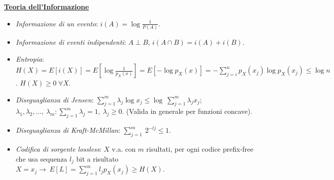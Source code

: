 \documentclass[8pt]{extarticle}
\begin{document}
\begin{multicols*}{3}
    \textbf{\underline{Teoria dell'Informazione}}
    \begin{itemize}
        \item \textit{Informazione di un evento}: $i(A)=\log{\frac{1}{P(A)}}$.
        \item \textit{Informazione di eventi indipendenti}: $A\perp B$, $i(A\cap B)=i(A)+i(B)$.
        \item \textit{Entropia}: $H(X)=E\left[i(X)\right]=E\left[\log\frac{1}{p_{X}(x)}\right]=E\left[-\log p_{X}(x)\right]=-\sum_{j=i}^{n}p_{X}(x_{j})\log p_{X}(x_{j})\leq \log n$. $H(X)\ge 0\; \forall X$.
        \item \textit{Diseguaglianza di Jensen}: $\sum_{j=1}^{m}{\lambda_j\log{x_j}}\le\log{\ \sum_{j=1}^{m}{\lambda_jx_j}}$; $\lambda_1,\lambda_2,\ldots,\ \lambda_m:\sum_{j=1}^{m}\lambda_j=1,\ \lambda_j\geq 0$. (Valida in generale per funzioni concave).
        \item \textit{Diseguaglianza di Kraft-McMillan}: $\sum_{j=1}^{m}{\ 2^{-lj}}\le1$.
        \item \textit{Codifica di sorgente lossless}: $X$ v.a. con $m$ risultati, per ogni codice prefix-free che usa sequenza $l_j$ bit a risultato $X=x_j\rightarrow\ E\left[L\right]=\sum_{j=1}^{m}{l_jp_X\left(x_j\right)}\geq H\left(X\right)$.
    \end{itemize}

\end{multicols*}
\end{document}

